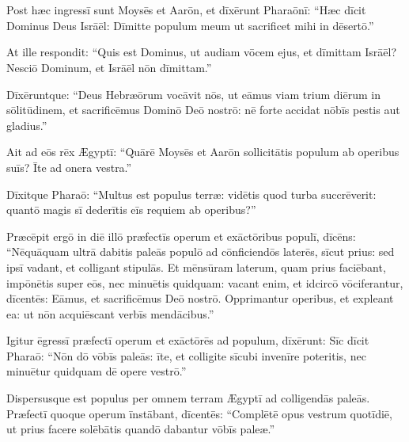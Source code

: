 \chapter{}
\thispagestyle{empty}

Post hæc ingressī sunt Moysēs et Aarōn,
et dīxērunt Pharaōnī: ``Hæc dīcit Dominus Deus Isrāēl:
Dīmitte populum meum ut sacrificet mihi in dēsertō.''

At ille respondit: ``Quis est Dominus,
ut audiam vōcem ejus, et dīmittam Isrāēl?
Nesciō Dominum, et Isrāēl nōn dīmittam.''

Dīxēruntque: ``Deus Hebræōrum vocāvit nōs,
ut eāmus viam trium diērum in sōlitūdinem,
et sacrificēmus Dominō Deō nostrō:
nē forte accidat nōbīs pestis aut gladius.''

Ait ad eōs rēx Ægyptī: ``Quārē Moysēs et Aarōn sollicitātis populum ab operibus suīs? Īte ad onera vestra.''

Dīxitque Pharaō: ``Multus est populus terræ:
vidētis quod turba succrēverit:
quantō magis sī dederītis eīs requiem ab operibus?''

Præcēpit ergō in diē illō præfectīs operum
et exāctōribus populī, dīcēns: 
``Nēquāquam ultrā dabitis paleās populō ad cōnficiendōs laterēs,
sīcut prius: sed ipsī vadant, et colligant stipulās.
Et mēnsūram laterum, quam prius faciēbant,
impōnētis super eōs, nec minuētis quidquam:
vacant enim, et idcircō vōciferantur, dīcentēs:
Eāmus, et sacrificēmus Deō nostrō.
Opprimantur operibus, et expleant ea:
ut nōn acquiēscant verbīs mendācibus.''

Igitur ēgressī præfectī operum et exāctōrēs ad populum,
dīxērunt: Sīc dīcit Pharaō: ``Nōn dō vōbīs paleās: īte,
et colligite sīcubi invenīre poteritis,
nec minuētur quidquam dē opere vestrō.''

Dispersusque est populus per omnem terram Ægyptī ad colligendās paleās.
Præfectī quoque operum
īnstābant, dīcentēs: ``Complētē opus vestrum quotīdiē,
ut prius facere solēbātis quandō dabantur vōbīs paleæ.''


